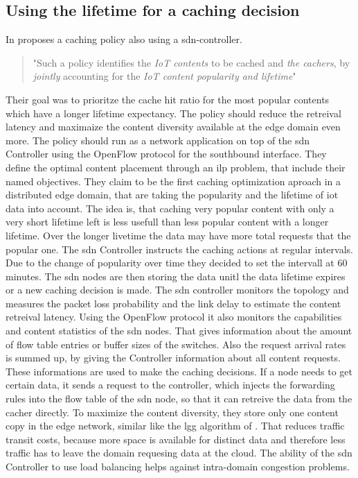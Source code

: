 \documentclass[conference]{IEEEtran}
\begin{document}
	\subsection{Using the lifetime for a caching decision}
	\label{sec:lifetime-caching}

	In \citeyear{caching-2} \cite{caching-2} proposes a caching policy also using a \ac{sdn}-controller. 
	\begin{quote}
		"Such a policy identifies the \textit{IoT contents} to be cached and \textit{the cachers}, by \textit{jointly} accounting for the \textit{IoT content popularity and lifetime}" \cite{caching-2} 
	\end{quote}

	Their goal was to prioritze the cache hit ratio for the most popular contents which have a longer lifetime expectancy. The policy should reduce the retreival latency and maximaize the content diversity available at the edge domain even more. The policy should run as a network application on top of the \ac{sdn} Controller using the OpenFlow protocol for the southbound interface. They define the optimal content placement through an \ac{ilp} problem, that include their named objectives. They claim to be the first caching optimization aproach in a distributed edge domain, that are taking the popularity and the lifetime of \ac{iot} data into account. The idea is, that caching very popular content with only a very short lifetime left is less usefull than less popular content with a longer lifetime. Over the longer livetime the data may have more total requests that the popular one.
	The \ac{sdn} Controller instructs the caching actions at regular intervals. Due to the change of popularity over time \cite{caching-5} they decided to set the intervall at 60 minutes. The \ac{sdn} nodes are then storing the data unitl the data lifetime expires or a new caching decision is made. The \ac{sdn} controller monitors the topology and measures the packet loss probability and the link delay to estimate the content retreival latency. Using the OpenFlow protocol it also monitors the capabilities and content statistics of the \ac{sdn} nodes. That gives information about the amount of flow table entries or buffer sizes of the switches. Also the request arrival rates is summed up, by giving the Controller information about all content requests. These informations are used to make the caching decisions.
	If a node needs to get certain data, it sends a request to the controller, which injects the forwarding rules into the flow table of the \ac{sdn} node, so that it can retreive the data from the cacher directly. To maximize the content diversity, they store only one content copy in the edge network, similar like the \ac{lgg} algorithm of \cite{caching-8}. That reduces traffic transit costs, because more space is available for distinct data and therefore less traffic has to leave the domain requesing data at the cloud. The ability of the \ac{sdn} Controller to use load balancing helps against intra-domain congestion problems. 
\end{document}
